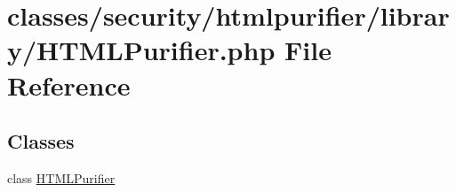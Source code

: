 \hypertarget{HTMLPurifier_8php}{\section{classes/security/htmlpurifier/library/\+H\+T\+M\+L\+Purifier.php File Reference}
\label{HTMLPurifier_8php}
}
\subsection*{Classes}
\begin{DoxyCompactItemize}
\item 
class \hyperlink{classHTMLPurifier}{H\+T\+M\+L\+Purifier}
\end{DoxyCompactItemize}
